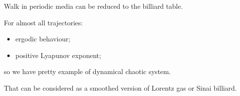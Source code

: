 Walk in periodic media can be reduced to the billiard table.

\begin{minipage}{0.5\textwidth}
      \begin{figure}[h]
    \end{figure}
\end{minipage}
\hfill
\begin{minipage}{0.45\textwidth}
For almost all trajectories:
    \begin{itemize}
        \item[\textcolor{mygreen}{\checkmark}] ergodic behaviour;
        \item[\textcolor{mygreen}{\checkmark}] positive Lyapunov exponent;
    \end{itemize}
    so we have pretty example of dynamical chaotic system.
\end{minipage}


That can be considered as a smoothed version of Lorentz gas or Sinai billiard.